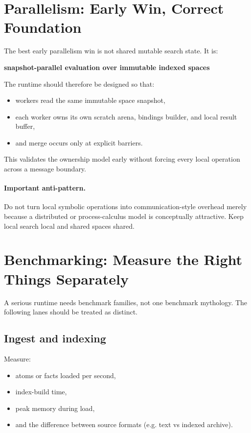 \documentclass[11pt]{article}
\begin{document}
\section{Parallelism: Early Win, Correct Foundation}

The best early parallelism win is not shared mutable search state. It is:
\begin{center}
\textbf{snapshot-parallel evaluation over immutable indexed spaces}
\end{center}

The runtime should therefore be designed so that:
\begin{itemize}[leftmargin=2em]
  \item workers read the same immutable space snapshot,
  \item each worker owns its own scratch arena, bindings builder, and local result buffer,
  \item and merge occurs only at explicit barriers.
\end{itemize}

This validates the ownership model early without forcing every local operation across a message boundary.

\paragraph{Important anti-pattern.}
Do not turn local symbolic operations into communication-style overhead merely because a distributed or process-calculus model is conceptually attractive. Keep local search local and shared spaces shared.

\section{Benchmarking: Measure the Right Things Separately}

A serious runtime needs benchmark families, not one benchmark mythology. The following lanes should be treated as distinct.

\subsection{Ingest and indexing}
Measure:
\begin{itemize}[leftmargin=2em]
  \item atoms or facts loaded per second,
  \item index-build time,
  \item peak memory during load,
  \item and the difference between source formats (e.g. text vs indexed archive).
\end{itemize}
\end{document}
